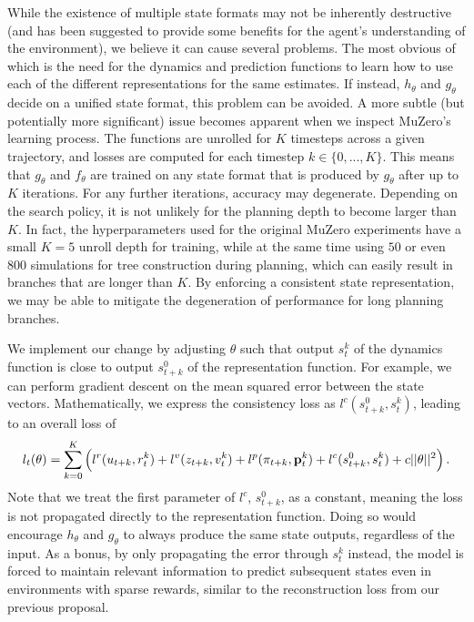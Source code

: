 While the existence of multiple state formats may not be inherently destructive (and has been suggested to provide some benefits for the agent's understanding of the environment), we believe it can cause several problems. The most obvious of which is the need for the dynamics and prediction functions to learn how to use each of the different representations for the same estimates. If instead, $h_\theta$ and $g_\theta$ decide on a unified state format, this problem can be avoided. A more subtle (but potentially more significant) issue becomes apparent when we inspect MuZero's learning process. The functions are unrolled for $K$ timesteps across a given trajectory, and losses are computed for each timestep $k \in \{0, ..., K\}$. This means that $g_\theta$ and $f_\theta$ are trained on any state format that is produced by $g_\theta$ after up to $K$ iterations. For any further iterations, accuracy may degenerate. Depending on the search policy, it is not unlikely for the planning depth to become larger than $K$. In fact, the hyperparameters used for the original MuZero experiments have a small $K=5$ unroll depth for training, while at the same time using $50$ or even $800$ simulations for tree construction during planning, which can easily result in branches that are longer than $K$. By enforcing a consistent state representation, we may be able to mitigate the degeneration of performance for long planning branches.

We implement our change by adjusting $\theta$ such that output $s^k_t$ of the dynamics function is close to output $s^0_{t+k}$ of the representation function. For example, we can perform gradient descent on the mean squared error between the state vectors. Mathematically, we express the consistency loss as $l^c(s^0_{t+k}, s^k_t)$, leading to an overall loss of
\begin{equation*}
    l_t(\theta) = \sum^K_{k=0} \left(l^r(u_{t+k}, r_t^k) + l^v(z_{t+k}, v_t^k) + l^p(\pi_{t+k}, \text{\textbf{p}}_t^k) + l^c(s^0_{t+k}, s^k_t) + c||\theta||^2\right).
\end{equation*}
Note that we treat the first parameter of $l^c$, $s^0_{t+k}$, as a constant, meaning the loss is not propagated directly to the representation function. Doing so would encourage $h_\theta$ and $g_\theta$ to always produce the same state outputs, regardless of the input. As a bonus, by only propagating the error through $s_t^k$ instead, the model is forced to maintain relevant information to predict subsequent states even in environments with sparse rewards, similar to the reconstruction loss from our previous proposal.